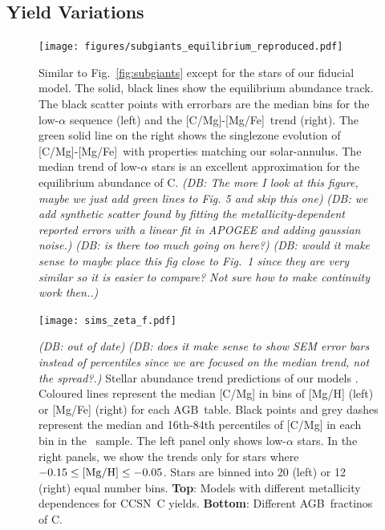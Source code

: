 \documentclass[fleqn,
usenatbib]{mnras}
\newcommand{\agb}{AGB}
\newcommand{\cc}{CCSN}
\newcommand{\caafe}{[C/Mg]-[Mg/Fe]}
\newcommand{\dbnote}[1]{ {\color{Thistle} \textit{\small (DB: #1)}} }
\begin{document}
\subsection{Yield Variations}\label{sec:results_highmass}
\label{sec:agb_results}


\begin{figure}
    \centering
    \texttt{[image: figures/subgiants\_equilibrium\_reproduced.pdf]}
    \caption{
    Similar to Fig.~\ref{fig:subgiants} except for the stars of our fiducial model. 
    The solid, black lines show the equilibrium abundance track. The black scatter points with errorbars are the median bins for the low-$\alpha$ sequence (left) and the \caafe\ trend (right). The green solid line on the right shows the singlezone evolution of \caafe\ with properties matching our solar-annulus. The median trend of low-$\alpha$ stars is an excellent approximation for the equilibrium abundance of C. 
    \dbnote{The more I look at this figure, maybe we just add green lines to Fig. 5 and skip this one}
    \dbnote{we add synthetic scatter found by fitting the metallicity-dependent reported errors with a linear fit in APOGEE and adding gaussian noise.}
    \dbnote{is there too much going on here?}
    \dbnote{would it make sense to maybe place this fig close to Fig.~1 since they are very similar so it is easier to compare? Not sure how to make continuity work then..}
    \label{fig:equilibrium_validity}
    }
\end{figure}




\begin{figure}
\texttt{[image: sims\_zeta\_f.pdf]}

\caption[]{
\dbnote{out of date}
    \dbnote{does it make sense to show SEM error bars instead of percentiles since we are focused on the median trend, not the spread?.}
    Stellar abundance trend predictions of our models . Coloured lines represent the median [C/Mg] in bins of [Mg/H] (left) or [Mg/Fe] (right) for each \agb\ table. Black points and grey dashes represent the median and 16th-84th percentiles of [C/Mg] in each bin in the \citet{jack}~sample. 
    The left panel only shows low-$\alpha$ stars. In the right panels, we show the trends only for stars where $-0.15\leq {\rm [Mg/H]}\leq -0.05$.
    Stars are binned into 20 (left) or 12 (right) equal number bins. 
    \textbf{Top}: Models with different metallicity dependences for  \cc\ C yields. \textbf{Bottom}: Different \agb\ fractinos of C.
}
\label{fig:zeta_f}
\end{figure}
\end{document}
